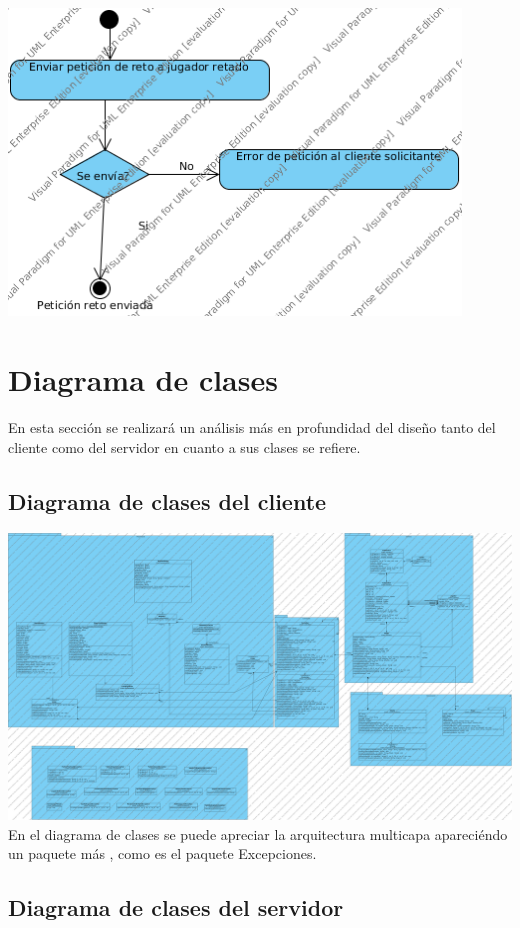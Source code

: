 \documentclass[a4paper,11pt,oneside]{article}
\begin{document}
\includegraphics[width=0.9\textwidth]{img/ms_RetarJugadorServidor.png}\\[1cm]

\section{Diagrama de clases}

En esta sección se realizará un análisis más en profundidad del diseño tanto del cliente como del servidor en cuanto a sus clases se refiere.

\subsection{Diagrama de clases del cliente}

\includegraphics[width=1\textwidth]{img/ddc_Cliente.png}\\[1cm]

En el diagrama de clases se puede apreciar la arquitectura multicapa apareciéndo un paquete más , como es el paquete Excepciones.
\subsection{Diagrama de clases del servidor}
\end{document}
